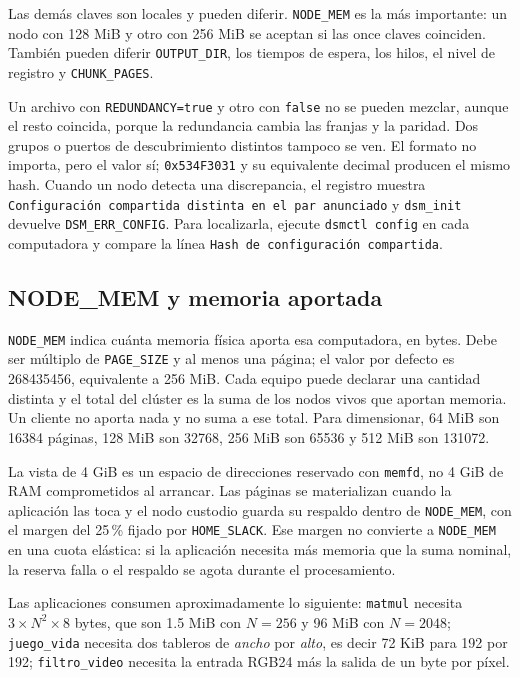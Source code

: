 Las demás claves son locales y pueden diferir. \texttt{NODE\_MEM} es la más importante: un nodo con 128 MiB y otro con 256 MiB se aceptan si las once claves coinciden. También pueden diferir \texttt{OUTPUT\_DIR}, los tiempos de espera, los hilos, el nivel de registro y \texttt{CHUNK\_PAGES}.

Un archivo con \texttt{REDUNDANCY=true} y otro con \texttt{false} no se pueden mezclar, aunque el resto coincida, porque la redundancia cambia las franjas y la paridad. Dos grupos o puertos de descubrimiento distintos tampoco se ven. El formato no importa, pero el valor sí; \texttt{0x534F3031} y su equivalente decimal producen el mismo hash. Cuando un nodo detecta una discrepancia, el registro muestra \texttt{Configuración compartida distinta en el par anunciado} y \texttt{dsm\_init} devuelve \texttt{DSM\_ERR\_CONFIG}. Para localizarla, ejecute \texttt{dsmctl config} en cada computadora y compare la línea \texttt{Hash de configuración compartida}.

\subsection{NODE\_MEM y memoria aportada}\label{subsec:node-mem}

\texttt{NODE\_MEM} indica cuánta memoria física aporta esa computadora, en bytes. Debe ser múltiplo de \texttt{PAGE\_SIZE} y al menos una página; el valor por defecto es 268435456, equivalente a 256 MiB. Cada equipo puede declarar una cantidad distinta y el total del clúster es la suma de los nodos vivos que aportan memoria. Un cliente no aporta nada y no suma a ese total. Para dimensionar, 64 MiB son 16384 páginas, 128 MiB son 32768, 256 MiB son 65536 y 512 MiB son 131072.

La vista de 4 GiB es un espacio de direcciones reservado con \texttt{memfd}, no 4 GiB de RAM comprometidos al arrancar. Las páginas se materializan cuando la aplicación las toca y el nodo custodio guarda su respaldo dentro de \texttt{NODE\_MEM}, con el margen del 25\,\% fijado por \texttt{HOME\_SLACK}. Ese margen no convierte a \texttt{NODE\_MEM} en una cuota elástica: si la aplicación necesita más memoria que la suma nominal, la reserva falla o el respaldo se agota durante el procesamiento.

Las aplicaciones consumen aproximadamente lo siguiente: \texttt{matmul} necesita $3 \times N^2 \times 8$ bytes, que son 1.5 MiB con $N=256$ y 96 MiB con $N=2048$; \texttt{juego\_vida} necesita dos tableros de \textit{ancho} por \textit{alto}, es decir 72 KiB para 192 por 192; \texttt{filtro\_video} necesita la entrada RGB24 más la salida de un byte por píxel.


